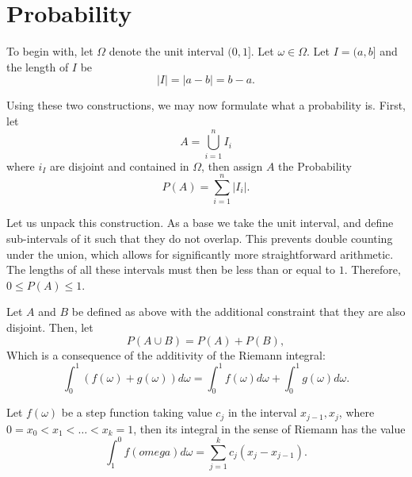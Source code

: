 \section{Probability}

To begin with, let \( \Omega \) denote the unit interval \( (0,1] \). Let \( \omega \in \Omega \). Let \( I = (a,b] \) and the length of \( I \) be 
\begin{equation}
  |I| = |a-b| = b-a.  
\end{equation} \cite{Billingsley1995} 

Using these two constructions, we may now formulate what a probability is. First, let 
\begin{equation}
  A = \bigcup^n_{i=1}I_i
\end{equation}
where \( i_I \) are disjoint and contained in \( \Omega \), then assign \( A \) the Probability 
\begin{equation}
  P(A) = \sum^n_{i=1}|I_i|. 
\end{equation} \cite{Billingsley1995} 

Let us unpack this construction. As a base we take the unit interval, and define sub-intervals of it such that they do not overlap. This prevents double counting under the union, which allows for significantly more straightforward arithmetic. The lengths of all these intervals must then be less than or equal to \( 1 \). Therefore, \( 0\leq P(A)\leq1 \).   

Let \( A \) and \( B \) be defined as above with the additional constraint that they are also disjoint. Then, let
\begin{equation}
  P(A\cup B) = P(A)+P(B),
\end{equation}
Which is a consequence of the additivity of the Riemann integral:\begin{equation}
  \int^1_0(f(\omega)+g(\omega))d\omega = \int^1_0 f(\omega)d\omega+\int^1_0g(\omega)d\omega. 
\end{equation} \cite{Billingsley1995} 

Let \( f(\omega) \) be a step function taking value \( c_j \) in the interval \( x_{j-1},x_j \), where \( 0 = x_0 < x_1< \dots <x_k = 1 \), then its integral in the sense of Riemann has the value \begin{equation}
  \int_{1}^{0} f(omega)d\omega = \sum^k_{j=1}c_j(x_j-x_{j-1}).
\end{equation}   

